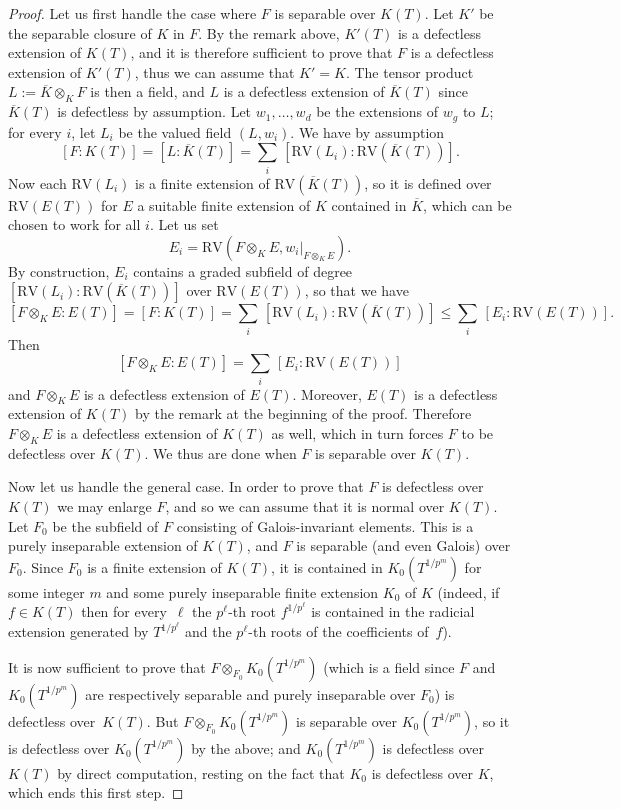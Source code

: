 \documentclass[JEP,XML,SOM,Unicode,ThmDefs,NoEqCountersInSection,published]{cedram}
\theoremstyle{plain}
\theoremstyle{definition}
\begin{document}
\begin{proof}
Let us first handle the case where $F$ is separable over $K(T)$. Let
$K'$ be the separable closure of $K$ in $F$. By the remark above,
$K'(T)$ is a defectless extension of $K(T)$, and it is therefore
sufficient to prove that $F$ is a defectless extension of
$K'(T)$, thus we can assume that $K'=K$.
The tensor product $L:=\overline K\otimes_K F$ is then a field, and $L$ is a defectless extension of $\overline K(T)$ since $\overline
K(T)$ is defectless by assumption. Let $w_1,\ldots, w_d$ be the extensions of $w_g$ to $L$; for every $i$, let
$L_i$ be the valued field $(L,w_i)$. We have by assumption
\[[F:K(T)]=[L:\overline K(T)]=\sum_i \, [\mathrm{RV}(L_i):\mathrm{RV}(\overline K(T))].\]
Now each $\mathrm{RV}(L_i)$ is a finite extension of $\mathrm{RV}(\overline K(T))$, so it is defined
over $\mathrm{RV}(E(T))$ for $E$ a suitable finite extension of $K$ contained
in $\overline K$, which can be chosen to
work for all $i$. Let us
set
\[E_i=\mathrm{RV}(F\otimes_K E, w_i|_{F\otimes_K E}).\]
By construction, $E_i$
contains
a graded subfield of degree $[\mathrm{RV}(L_i):\mathrm{RV}(\overline K(T))]$
over $\mathrm{RV}(E(T))$, so that
we have
\[[F\otimes_K E:E(T)]=[F:K(T)]=\sum_i \, [\mathrm{RV}(L_i):\mathrm{RV}(\overline K(T))]
\leq \sum_i \, [E_i:\mathrm{RV}(E(T))].\]
Then
\[[F\otimes_K E:E(T)]=\sum_i \, [E_i:\mathrm{RV}(E(T))]\]
and $F\otimes_K E$ is a defectless extension of $E(T)$. Moreover,
$E(T)$ is a defectless extension of $K(T)$ by the remark at the beginning of the proof.
Therefore $F\otimes_K E$ is a defectless extension of $K(T)$ as well, which in turn forces
$F$ to be defectless over $K(T)$. We thus are done when $F$ is separable
over $K(T)$.

Now let us handle the general case.
In order to prove that $F$ is defectless over $K(T)$ we may enlarge $F$, and so
we can assume that it is normal over $K(T)$. Let $F_0$
be the subfield of $F$ consisting of Galois-invariant elements. This is a purely inseparable
extension of $K(T)$, and $F$ is separable (and even Galois) over $F_0$.
Since $F_0$ is a finite extension of $K(T)$, it is contained in $K_0(T^{1/p^m})$
for some integer $m$ and some purely inseparable finite extension $K_0$ of $K$ (indeed,
if $f\in K(T)$ then for every~$\ell$ the $p^\ell$-th root $f^{1/p^{\ell}}$ is
contained in the radicial extension
generated by $T^{1/p^{\ell}}$ and the $p^{\ell}$-th roots
of the coefficients of~$f$).

It is now sufficient to prove that $F\otimes_{F_0}K_0(T^{1/p^m})$ (which is a field since
$F$ and $K_0(T^{1/p^m})$ are respectively separable
and purely inseparable over $F_0$) is defectless over~$K(T)$. But $ F\otimes_{F_0}K_0(T^{1/p^m})$ is
separable over $K_0(T^{1/p^m})$, so it is
defectless over $K_0(T^{1/p^m})$ by the above; and $K_0(T^{1/p^m})$ is defectless over
$K(T)$ by direct computation, resting on the fact that $K_0$ is defectless over $K$, which ends this first step.


\end{proof}
\end{document}
